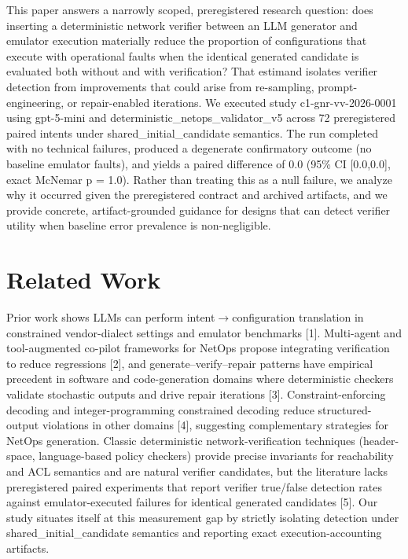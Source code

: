 \documentclass[conference]{IEEEtran}
\begin{document}
This paper answers a narrowly scoped, preregistered research question: does inserting a deterministic network verifier between an LLM generator and emulator execution materially reduce the proportion of configurations that execute with operational faults when the identical generated candidate is evaluated both without and with verification? That estimand isolates verifier detection from improvements that could arise from re-sampling, prompt-engineering, or repair-enabled iterations. We executed study c1-gnr-vv-2026-0001 using gpt-5-mini and deterministic\_netops\_validator\_v5 across 72 preregistered paired intents under shared\_initial\_candidate semantics. The run completed with no technical failures, produced a degenerate confirmatory outcome (no baseline emulator faults), and yields a paired difference of 0.0 (95\% CI [0.0,0.0], exact McNemar p = 1.0). Rather than treating this as a null failure, we analyze why it occurred given the preregistered contract and archived artifacts, and we provide concrete, artifact-grounded guidance for designs that can detect verifier utility when baseline error prevalence is non-negligible.

\section{Related Work}
Prior work shows LLMs can perform intent\ensuremath{\rightarrow}configuration translation in constrained vendor-dialect settings and emulator benchmarks [1]. Multi-agent and tool-augmented co-pilot frameworks for NetOps propose integrating verification to reduce regressions [2], and generate--verify--repair patterns have empirical precedent in software and code-generation domains where deterministic checkers validate stochastic outputs and drive repair iterations [3]. Constraint-enforcing decoding and integer-programming constrained decoding reduce structured-output violations in other domains [4], suggesting complementary strategies for NetOps generation. Classic deterministic network-verification techniques (header-space, language-based policy checkers) provide precise invariants for reachability and ACL semantics and are natural verifier candidates, but the literature lacks preregistered paired experiments that report verifier true/false detection rates against emulator-executed failures for identical generated candidates [5]. Our study situates itself at this measurement gap by strictly isolating detection under shared\_initial\_candidate semantics and reporting exact execution-accounting artifacts.
\end{document}
